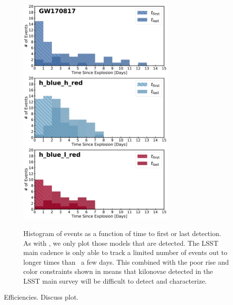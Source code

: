 \begin{figure}[!t]
\begin{center}
\hspace*{-0.1in}
\scalebox{1.}
{\includegraphics[width=0.7\textwidth]{./figs/chapter6/f2.pdf}}
\caption{\singlespace Histogram of events as a function of time to first or last detection. As with , we only plot those models that are detected. The LSST main cadence is only able to track a limited number of events out to longer times than \apx~a few days. This combined with the poor rise and color constraints shown in  means that kilonovae detected in the LSST main survey will be difficult to detect and characterize.}
\label{fig:ch6_t_hist}
\end{center}
\end{figure}

Efficiencies. Discuss plot.

